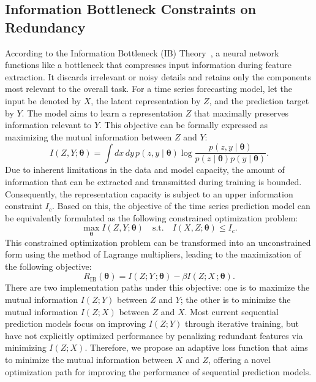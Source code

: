 \documentclass{article}
\begin{document}
\subsection{Information Bottleneck Constraints on Redundancy}
According to the Information Bottleneck (IB) Theory~\cite{slonim1999agglomerative}, a neural network functions like a bottleneck that compresses input information during feature extraction. It discards irrelevant or noisy details and retains only the components most relevant to the overall task. For a time series forecasting model, let the input be denoted by \( X \), the latent representation by \( Z \), and the prediction target by \( Y \). The model aims to learn a representation \( Z \) that maximally preserves information relevant to \( Y \). This objective can be formally expressed as maximizing the mutual information between \( Z \) and \( Y \):
\begin{equation}
I(Z, Y; \boldsymbol{\theta}) = \int dx\, dy\, p(z, y \mid \boldsymbol{\theta}) \log \frac{p(z, y \mid \boldsymbol{\theta})}{p(z \mid \boldsymbol{\theta}) p(y \mid \boldsymbol{\theta})}.
\end{equation}
Due to inherent limitations in the data and model capacity, the amount of information that can be extracted and transmitted during training is bounded. Consequently, the representation capacity is subject to an upper information constraint \( I_c \). Based on this, the objective of the time series prediction model can be equivalently formulated as the following constrained optimization problem:
\begin{equation}
\max_{\boldsymbol{\theta}} I(Z, Y; \boldsymbol{\theta}) \quad \text{s.t.} \quad I(X, Z; \boldsymbol{\theta}) \leq I_c.
\end{equation}
This constrained optimization problem can be transformed into an unconstrained form using the method of Lagrange multipliers, leading to the maximization of the following objective\cite{alemi2019deepvariationalinformationbottleneck}:
\begin{equation}
R_{\mathrm{IB}}(\boldsymbol{\theta}) = I(Z; Y \, ; \boldsymbol{\theta}) - \beta I(Z; X \, ; \boldsymbol{\theta}).
\end{equation}
There are two implementation paths under this objective: one is to maximize the mutual information \( I(Z; Y) \) between \( Z \) and \( Y \); the other is to minimize the mutual information \( I(Z; X) \) between \( Z \) and \( X \). Most current sequential prediction models focus on improving \( I(Z; Y) \) through iterative training, but have not explicitly optimized performance by penalizing redundant features via minimizing \( I(Z; X) \). Therefore, we propose an adaptive loss function that aims to minimize the mutual information between \( X \) and \( Z \), offering a novel optimization path for improving the performance of sequential prediction models.
\end{document}
